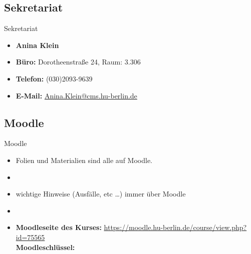 %
\subsection{Sekretariat}

\begin{frame}{Sekretariat}
	
\begin{itemize}
	\item[] \textbf{Anina Klein}	
	\item \textbf{Büro:} Dorotheenstraße 24, Raum: 3.306
	\item \textbf{Telefon:} (030)2093-9639
	\item \textbf{E-Mail:} \href{mailto:Anina.Klein@cms.hu-berlin.de}{Anina.Klein@cms.hu-berlin.de}
\end{itemize}	

\end{frame}



%
\subsection{Moodle}	

\begin{frame}{Moodle}

\begin{itemize}
	\item Folien und Materialien sind alle auf Moodle.
	\item[]
	\item wichtige Hinweise (Ausfälle, etc \dots) immer über Moodle
	\item[]
	\item \textbf{Moodleseite des Kurses:} \url{https://moodle.hu-berlin.de/course/view.php?id=75565}\\
	\textbf{Moodleschlüssel:} %
\end{itemize}		

\end{frame}

